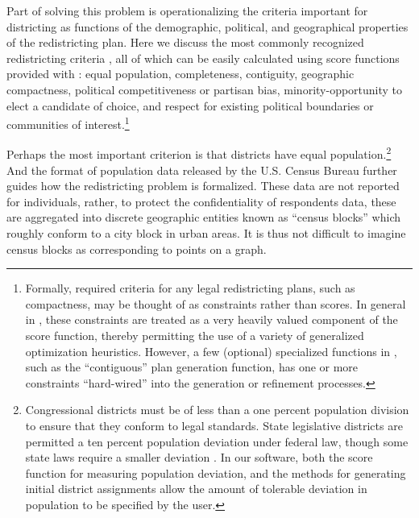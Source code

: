 \documentclass[article]{JSSstyle/jss}
\begin{document}
Part of solving this problem is operationalizing the criteria important 
for districting as functions of the demographic, political, and geographical 
properties of the redistricting plan. Here we discuss the most commonly recognized redistricting criteria \citep[see][]{McDonald04}, 
all of which can be easily calculated using score functions provided with : equal population, 
completeness, contiguity, geographic compactness, political competitiveness or partisan bias, 
minority-opportunity to elect a candidate of choice, and 
respect for existing political boundaries or communities of interest.\footnote{Formally, required criteria for any legal redistricting plans, 
such as compactness, may be thought of as constraints rather than scores. 
In general in , these constraints are treated as 
a very heavily valued component of the score function, thereby permitting the use of a variety of generalized optimization heuristics. However, a few (optional) specialized functions in , such as the ``contiguous'' plan generation function, has one or more constraints ``hard-wired'' into the generation or refinement processes.} 

Perhaps the most important criterion is that districts 
 have equal population.\footnote{Congressional districts must be 
of less than a one percent population division to ensure that they 
conform to legal standards.  State legislative districts are 
permitted a ten percent population deviation under federal law, 
though some state laws require a smaller deviation \citep[][]{CainMacMc05}. In our software, both the score function for measuring population deviation, and the methods for generating initial district assignments allow the amount of tolerable deviation in population to be specified by the user.} And the format of population data released by the U.S. Census 
Bureau further guides how the redistricting problem is formalized.  
These data are not reported for individuals, rather, to protect the 
confidentiality of respondents data, these are aggregated into discrete 
geographic entities known as ``census blocks'' which roughly conform 
to a city block in urban areas. It is thus not difficult to imagine census blocks as corresponding to 
points on a graph.  
\end{document}
